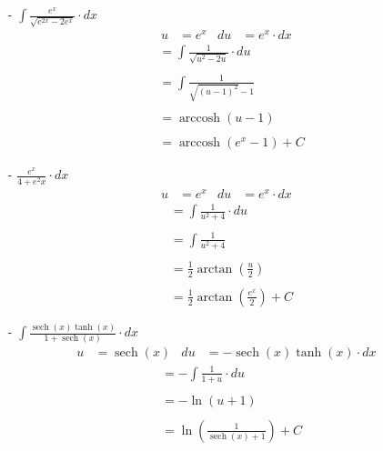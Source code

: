 \documentclass{report}
\DeclareMathOperator{\sech}{sech}
\DeclareMathOperator{\arccosh}{arccosh}
\begin{document}
  \begin{itemize}
    \item[-] $\displaystyle{\int \frac{e^x}{\sqrt{e^{2x} - 2e^x}} \cdot dx}$
      \begin{align*}
        u & = e^x & du & = e^x \cdot dx
      \end{align*}
      \begin{align*}
        & = \int \frac{1}{\sqrt{u^2 - 2u}} \cdot du \\ \\
        & = \int \frac{1}{\sqrt{(u - 1)^2} - 1} \\ \\
        & = \arccosh(u - 1) \\ \\
        & = \arccosh(e^x - 1) + C
      \end{align*}
  \end{itemize}

  \newpage

  \begin{itemize}
    \item[-] $\displaystyle{\frac{e^x}{4 + e^2x} \cdot dx}$
      \begin{align*}
        u & = e^x & du & = e^x \cdot dx
      \end{align*}
      \begin{align*}
        & = \int \frac{1}{u^2 + 4} \cdot du \\ \\
        & = \int \frac{1}{u^2 + 4} \\ \\
        & = \frac{1}{2}\arctan(\frac{u}{2}) \\ \\
        & = \frac{1}{2} \arctan(\frac{e^x}{2}) + C
      \end{align*}
  \end{itemize}

  \newpage

  \begin{itemize}
    \item[-] $\displaystyle{\int \frac{\sech(x) \tanh(x)}{1 + \sech(x)} \cdot dx}$
      \begin{align*}
        u & = \sech(x) & du & = -\sech(x) \tanh(x) \cdot dx
      \end{align*}
      \begin{align*}
        & = -\int \frac{1}{1 + u} \cdot du \\ \\
        & = -\ln(u + 1) \\\\
        & = \ln(\frac{1}{\sech(x) + 1}) + C
      \end{align*}
  \end{itemize}
\end{document}
